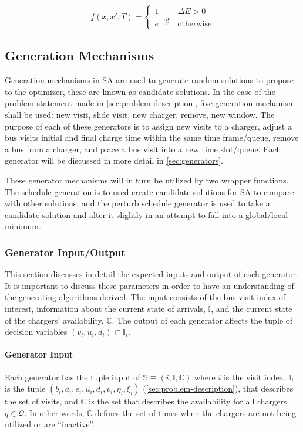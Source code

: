 \documentclass[11pt,a4paper,final]{article}
\newcommand{\visit}{(b_i, a_i, e_i, u_i, d_i, v_i, \eta_i, \xi_i)}
\newcommand{\I}{\mathbb{I}}                 %
\newcommand{\C}{\mathbb{C}}                 %
\newcommand{\Sol}{\mathbb{S}}               %
\newcommand{\Qset}{\mathcal{Q}}             %
\begin{document}
\begin{equation}
\label{eq:candaccept}
f(x,x',T) =
\begin{cases}
  1                 & \Delta E > 0 \\
  e^{- \frac{\Delta E}{T}} & \text{otherwise}
\end{cases}
\end{equation}

\subsection{Generation Mechanisms}
\label{sec:generation-mechanisms}
Generation mechanisms in SA are used to generate random solutions to propose to the optimizer, these are known as
candidate solutions. In the case of the problem statement made in \ref{sec:problem-description}, five generation mechanism
shall be used: new visit, slide visit, new charger, remove, new window. The purpose of each of these generators is to
assign new visits to a charger, adjust a bus visits initial and final charge time within the same time frame/queue,
remove a bus from a charger, and place a bus visit into a new time slot/queue. Each generator will be discussed in more
detail in \ref{sec:generators}.

These generator mechanisms will in turn be utilized by two wrapper functions. The schedule generation is to used create
candidate solutions for SA to compare with other solutions, and the perturb schedule generator is used to take a
candidate solution and alter it slightly in an attempt to fall into a global/local minimum.

\subsubsection{Generator Input/Output}
\label{sec:generator-input-output}
This section discusses in detail the expected inputs and output of each generator. It is important to discuss these
parameters in order to have an understanding of the generating algorithms derived. The input consists of the bus visit
index of interest, information about the current state of arrivals, \(\I\), and the current state of the chargers'
availability, \(\C\). The output of each generator affects the tuple of decision variables \((v_i, u_i, d_i) \subset \I_i\).

\paragraph{Generator Input}
\label{sec:org3e19629}
Each generator has the tuple input of \(\Sol \equiv (i, \I, \C)\) where \(i\) is the visit index, \(\I_i\) is the tuple \(\visit\)
(\ref{sec:problem-description}), that describes the set of visits, and \(\C\) is the set that describes the availability for
all chargers \(q \in \Qset\). In other words, \(\C\) defines the set of times when the chargers are not being utilized or are
``inactive''.
\end{document}
